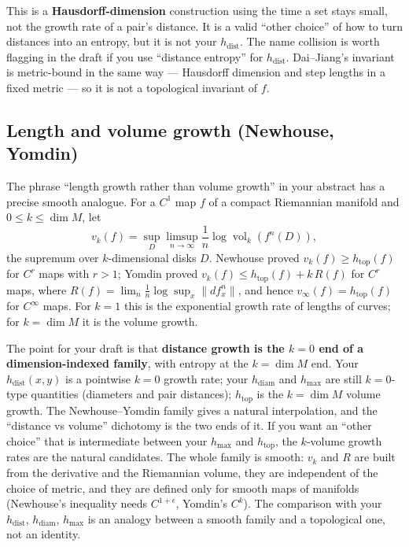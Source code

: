 \documentclass[
]{article}
\begin{document}
This is a \textbf{Hausdorff-dimension} construction using the time a set
stays small, not the growth rate of a pair's distance. It is a valid
``other choice'' of how to turn distances into an entropy, but it is not
your \(h_{\mathrm{dist}}\). The name collision is worth flagging in the
draft if you use ``distance entropy'' for \(h_{\mathrm{dist}}\).
Dai--Jiang's invariant is metric-bound in the same way --- Hausdorff
dimension and step lengths in a fixed metric --- so it is not a
topological invariant of \(f\).

\subsection{Length and volume growth (Newhouse,
Yomdin)}\label{length-and-volume-growth-newhouse-yomdin}

The phrase ``length growth rather than volume growth'' in your abstract
has a precise smooth analogue. For a \(C^1\) map \(f\) of a compact
Riemannian manifold and \(0\le k\le\dim M\), let \[
v_k(f)=\sup_{D}\limsup_{n\to\infty}\frac1n\log\operatorname{vol}_k(f^n(D)),
\] the supremum over \(k\)-dimensional disks \(D\). Newhouse proved
\(v_k(f)\ge h_{\mathrm{top}}(f)\) for \(C^r\) maps with \(r>1\); Yomdin
proved \(v_k(f)\le h_{\mathrm{top}}(f)+k\,R(f)\) for \(C^r\) maps, where
\(R(f)=\lim_n\frac1n\log\sup_x\|df^n_x\|\), and hence
\(v_\infty(f)=h_{\mathrm{top}}(f)\) for \(C^\infty\) maps. For \(k=1\)
this is the exponential growth rate of lengths of curves; for
\(k=\dim M\) it is the volume growth.

The point for your draft is that \textbf{distance growth is the \(k=0\)
end of a dimension-indexed family}, with entropy at the \(k=\dim M\)
end. Your \(h_{\mathrm{dist}}(x,y)\) is a pointwise \(k=0\) growth rate;
your \(h_{\mathrm{diam}}\) and \(h_{\max}\) are still \(k=0\)-type
quantities (diameters and pair distances); \(h_{\mathrm{top}}\) is the
\(k=\dim M\) volume growth. The Newhouse--Yomdin family gives a natural
interpolation, and the ``distance vs volume'' dichotomy is the two ends
of it. If you want an ``other choice'' that is intermediate between your
\(h_{\max}\) and \(h_{\mathrm{top}}\), the \(k\)-volume growth rates are
the natural candidates. The whole family is smooth: \(v_k\) and \(R\)
are built from the derivative and the Riemannian volume, they are
independent of the choice of metric, and they are defined only for
smooth maps of manifolds (Newhouse's inequality needs
\(C^{1+\epsilon}\), Yomdin's \(C^k\)). The comparison with your
\(h_{\mathrm{dist}}\), \(h_{\mathrm{diam}}\), \(h_{\max}\) is an analogy
between a smooth family and a topological one, not an identity.
\end{document}
